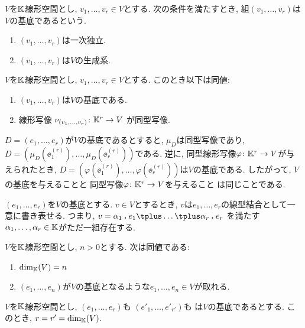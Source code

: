 \begin{definition}
  $V$を$\mathbb{K}$線形空間とし,
  $v_1,\ldots,v_r\in V$とする.
  次の条件を満たすとき,
  組$(v_1,\ldots,v_r)$は$V$の基底であるという.
  \begin{enumerate}
  \item $(v_1,\ldots,v_r)$は一次独立.
  \item $(v_1,\ldots,v_r)$は$V$の生成系.
  \end{enumerate}
\end{definition}
\begin{prop}
  $V$を$\mathbb{K}$線形空間とし,
  $v_1,\ldots,v_r\in V$とする.
  このとき以下は同値:
  \begin{enumerate}
  \item $(v_1,\ldots,v_r)$は$V$の基底である.
  \item 線形写像 $\nu_{(v_1,\ldots,v_r)}\colon \mathbb{K}^r\to V$
    が同型写像.
  \end{enumerate}
\end{prop}
\begin{remark}
  $D=(e_1,\ldots,e_r)$が$V$の基底であるとすると,
  $\mu_D$は同型写像であり,
  $D=(\mu_D(\ee^{(r)}_1),\ldots,\mu_D(\ee^{(r)}_r))$である.
  逆に, 同型線形写像$\varphi\colon \mathbb{K}^r\to V$が与えられたとき,
  $D=(\varphi(\ee^{(r)}_1),\ldots,\varphi(\ee^{(r)}_r))$は$V$の基底である.
  したがって,
  $V$の基底を与えることと
  同型写像$\varphi\colon \mathbb{K}^r\to V$を与えること
  は同じことである.
\end{remark}

\begin{prop}
  $(e_1,\ldots,e_r)$を$V$の基底とする.
  $v\in V$とするとき,
  $v$は$e_1,\ldots,e_r$の線型結合として一意に書き表せる.
  つまり,
  $v=\alpha_1\act e_1\plus \ldots\plus \alpha_r\act e_r$
  を満たす$\alpha_1,\ldots, \alpha_r\in\mathbb{K}$がただ一組存在する.
\end{prop}


\begin{lemma}
  $V$を$\mathbb{K}$線形空間とし, $n>0$とする.
  次は同値である:
  \begin{enumerate}
  \item $\dim_{\mathbb{K}}(V)=n$
  \item $(e_1,\ldots,e_n)$が$V$の基底となるような$e_1,\ldots,e_n\in V$が取れる.
  \end{enumerate}
\end{lemma}

\begin{cor}
  $V$を$\mathbb{K}$線形空間とし,
  $(e_1,\ldots,e_r)$も
  $(e'_1,\ldots,e'_{r'})$も
  は$V$の基底であるとする.
  このとき, $r=r'=\dim_{\mathbb{K}}(V)$.
\end{cor}



